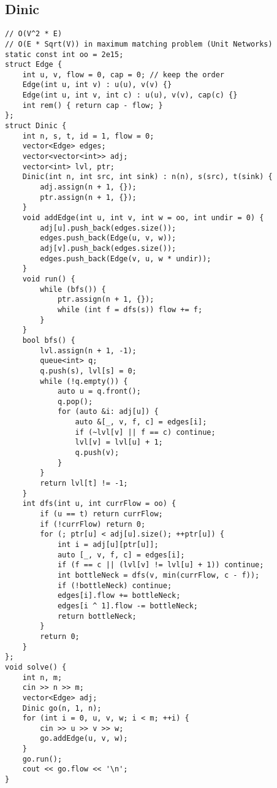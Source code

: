 \documentclass[twoside]{article}
\begin{document}
\begin{multicols*}{2}
{\subsection*{Dinic}
}
\begin{verbatim}
// O(V^2 * E)
// O(E * Sqrt(V)) in maximum matching problem (Unit Networks)
static const int oo = 2e15;
struct Edge {
    int u, v, flow = 0, cap = 0; // keep the order
    Edge(int u, int v) : u(u), v(v) {}
    Edge(int u, int v, int c) : u(u), v(v), cap(c) {}
    int rem() { return cap - flow; }
};
struct Dinic {
    int n, s, t, id = 1, flow = 0;
    vector<Edge> edges;
    vector<vector<int>> adj;
    vector<int> lvl, ptr;
    Dinic(int n, int src, int sink) : n(n), s(src), t(sink) {
        adj.assign(n + 1, {});
        ptr.assign(n + 1, {});
    }
    void addEdge(int u, int v, int w = oo, int undir = 0) {
        adj[u].push_back(edges.size());
        edges.push_back(Edge(u, v, w));
        adj[v].push_back(edges.size());
        edges.push_back(Edge(v, u, w * undir));
    }
    void run() {
        while (bfs()) {
            ptr.assign(n + 1, {});
            while (int f = dfs(s)) flow += f;
        }
    }
    bool bfs() {
        lvl.assign(n + 1, -1);
        queue<int> q;
        q.push(s), lvl[s] = 0;
        while (!q.empty()) {
            auto u = q.front();
            q.pop();
            for (auto &i: adj[u]) {
                auto &[_, v, f, c] = edges[i];
                if (~lvl[v] || f == c) continue;
                lvl[v] = lvl[u] + 1;
                q.push(v);
            }
        }
        return lvl[t] != -1;
    }
    int dfs(int u, int currFlow = oo) {
        if (u == t) return currFlow;
        if (!currFlow) return 0;
        for (; ptr[u] < adj[u].size(); ++ptr[u]) {
            int i = adj[u][ptr[u]];
            auto [_, v, f, c] = edges[i];
            if (f == c || (lvl[v] != lvl[u] + 1)) continue;
            int bottleNeck = dfs(v, min(currFlow, c - f));
            if (!bottleNeck) continue;
            edges[i].flow += bottleNeck;
            edges[i ^ 1].flow -= bottleNeck;
            return bottleNeck;
        }
        return 0;
    }
};
void solve() {
    int n, m;
    cin >> n >> m;
    vector<Edge> adj;
    Dinic go(n, 1, n);
    for (int i = 0, u, v, w; i < m; ++i) {
        cin >> u >> v >> w;
        go.addEdge(u, v, w);
    }
    go.run();
    cout << go.flow << '\n';
}

\end{verbatim}

{
}
\end{multicols*}
\end{document}
